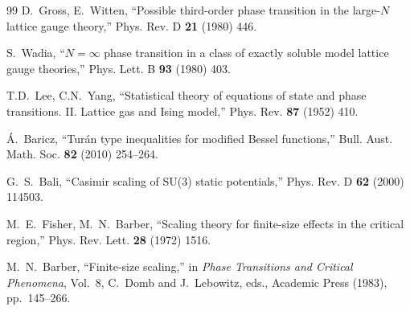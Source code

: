 \documentclass[12pt]{article}
\theoremstyle{definition}
\theoremstyle{remark}
\begin{document}
\begin{thebibliography}{99}
D.~Gross, E.~Witten, ``Possible third-order phase transition in the
large-$N$ lattice gauge theory,'' Phys. Rev. D \textbf{21} (1980)
446.

S.~Wadia, ``$N = \infty$ phase transition in a class of exactly
soluble model lattice gauge theories,'' Phys. Lett. B \textbf{93}
(1980) 403.

T.D.~Lee, C.N.~Yang, ``Statistical theory of equations of state and
phase transitions. II. Lattice gas and Ising model,'' Phys. Rev.
\textbf{87} (1952) 410.

\'A.~Baricz, ``Tur\'an type inequalities for modified Bessel
functions,'' Bull. Aust. Math. Soc. \textbf{82} (2010) 254--264.

G.~S.~Bali, ``Casimir scaling of SU(3) static potentials,''
Phys. Rev. D \textbf{62} (2000) 114503.

M.~E.~Fisher, M.~N.~Barber, ``Scaling theory for finite-size effects
in the critical region,'' Phys. Rev. Lett. \textbf{28} (1972) 1516.

M.~N.~Barber, ``Finite-size scaling,'' in \emph{Phase Transitions and
Critical Phenomena}, Vol.~8, C.~Domb and J.~Lebowitz, eds., Academic
Press (1983), pp.~145--266.

\end{thebibliography}
\end{document}
